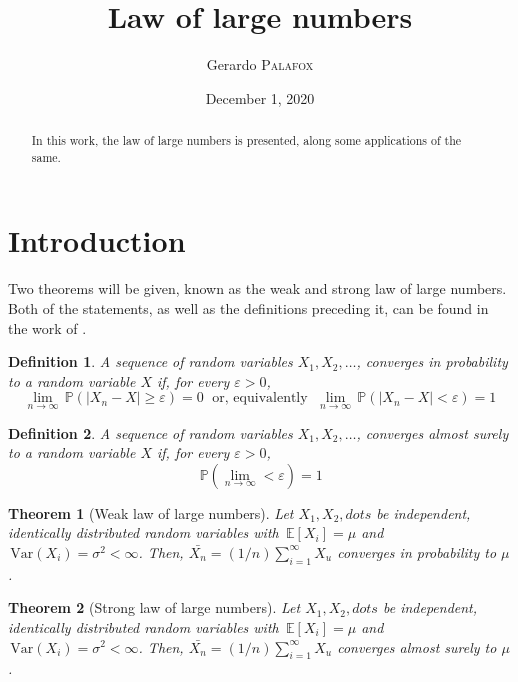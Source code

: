 \documentclass[letterpaper, 10 pt, conference]{article}
\title{Law of large numbers
}
\date{December 1, 2020}
\author{Gerardo {\textsc{Palafox}}}
\newtheorem{thm}{Theorem}
\newtheorem{defn}{Definition}
\newcommand\var[1]{\, \mathrm{Var} \left( #1 \right)}
\newcommand\pr[1]{\, \mathbb{P} \left( #1 \right)}
\newcommand\expec[1]{\, \mathbb{E} \left\lbrack #1 \right\rbrack}
\begin{document}
\maketitle
\begin{abstract}
	In this work, the law of large numbers is presented, along some applications of the same.
\end{abstract}
\section{Introduction}
 Two theorems will be given, known as the weak and strong law of large numbers. Both of the statements, as well as the definitions preceding it, can be found in the work of \citet{Casella_Berger_2002}. 
 
\begin{defn}\label{defn:converge_probability}
	A sequence of random variables $X_1, X_2, \dots$, converges in probability to a random variable $X$ if, for every $\varepsilon > 0$, 
	\begin{equation}
		\lim_{n \rightarrow \infty} \pr{|X_n - X| \geq \varepsilon } = 0 \; \text{ or, equivalently } \; \lim_{n \rightarrow \infty} \pr{|X_n - X| < \varepsilon } = 1
	\end{equation}
\end{defn}

\begin{defn}\label{defn:converge_as}
	A sequence of random variables $X_1, X_2, \dots$, converges almost surely to a random variable $X$ if, for every $\varepsilon > 0$, 
	\begin{equation}
		\pr{\lim_{n \rightarrow \infty} < \varepsilon} = 1
	\end{equation}
\end{defn}

\begin{thm}[Weak law of large numbers]\label{thm:weak_lln}
	Let $X_1, X_2, dots$ be independent, identically distributed random variables with $\expec{X_i} = \mu$ and $\var{X_i} = \sigma^2 < \infty$. Then, $\bar{X_n} = (1/n) \sum_{i = 1}^{\infty} X_u$ converges in probability to $\mu$.
\end{thm}

\begin{thm}[Strong law of large numbers]\label{thm:strong_lln}
	Let $X_1, X_2, dots$ be independent, identically distributed random variables with $\expec{X_i} = \mu$ and $\var{X_i} = \sigma^2 < \infty$. Then, $\bar{X_n} = (1/n) \sum_{i = 1}^{\infty} X_u$ converges almost surely to $\mu$.
\end{thm}
\end{document}
